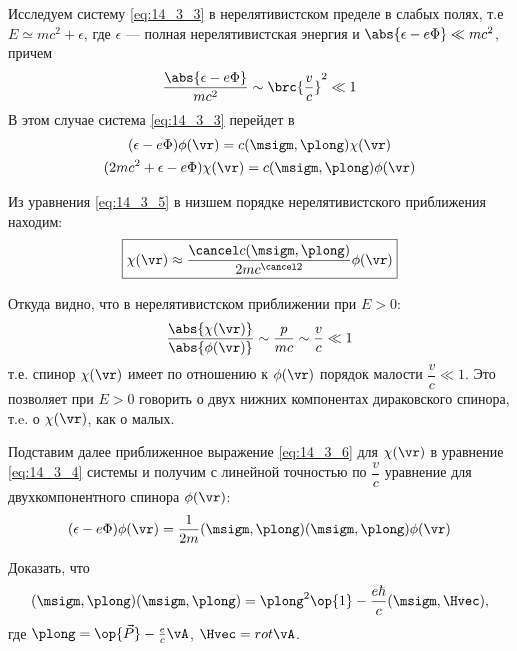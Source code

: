 Исследуем систему \eqref{eq:14_3_3} в нерелятивистском пределе в слабых полях, т.е $E \simeq mc^2 + \epsilon$, где $\epsilon$ --- полная нерелятивистская энергия и $\abs{\epsilon - e\Phi} \ll mc^2$, причем  
$$
\frac{\abs{\epsilon - e\Phi}}{mc^2} \sim \brc{\frac{v}{c}}^2 \ll 1
$$
В этом случае система \eqref{eq:14_3_3} перейдет в 
\begin{gather}
\label{eq:14_3_4}
(\epsilon - e\Phi) \phi(\vr) = c(\msigm, \plong) \chi(\vr) \\
\label{eq:14_3_5}
(2mc^2 + \epsilon - e\Phi) \chi(\vr) = c(\msigm, \plong) \phi(\vr)
\end{gather}

Из уравнения \eqref{eq:14_3_5} в низшем порядке нерелятивистского приближения находим:
\begin{equation}
\label{eq:14_3_6}
\boxed{\chi(\vr) \approx \frac{\cancel c (\msigm, \plong)}{2mc^{\cancel 2}} \phi(\vr)}
\end{equation}

Откуда видно, что в нерелятивистском приближении при $E > 0$:
$$
\frac{\abs{\chi(\vr)}}{\abs{\phi(\vr)}} \sim \frac{p}{mc}  \sim \frac{v}{c} \ll 1
$$
т.е. спинор $\chi(\vr)$ имеет по отношению к $\phi(\vr)$ порядок малости $\dfrac{v}{c} \ll 1$. Это позволяет при $E > 0$ говорить о двух нижних компонентах дираковского спинора, т.e. о $\chi(\vr)$, как о малых.

Подставим далее приближенное выражение \eqref{eq:14_3_6} для $\chi(\vr)$ в уравнение \eqref{eq:14_3_4} системы и получим с линейной точностью по $\dfrac{v}{c}$ уравнение для двухкомпонентного спинора $\phi(\vr)$:
\begin{equation}
\label{eq:14_3_7}
(\epsilon - e\Phi)\phi(\vr) = \frac{1}{2m}(\msigm, \plong)(\msigm, \plong) \phi(\vr)
\end{equation}

\begin{excr}
Доказать, что
$$
(\msigm, \plong)(\msigm, \plong) = \plong^2 \op{1} - \frac{e\hbar}{c}(\msigm, \Hvec),
$$
где $\plong = \op{\vec{P}} - \frac{e}{c} \vA$, $\Hvec = rot \vA$.
\end{excr}

